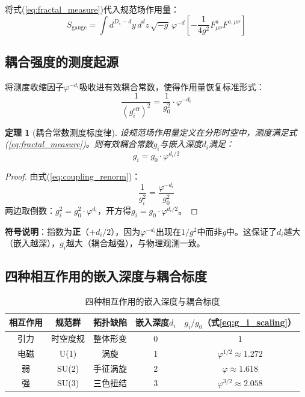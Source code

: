 \documentclass[12pt,a4paper,twocolumn]{article}
\renewcommand{\phi}{\varphi}
\newtheorem{theorem}{定理}[section]
\begin{document}
将式(\ref{eq:fractal_measure})代入规范场作用量：
\[
S_{\text{gauge}} = \int d^{D_s-d}y \, d^d z \, \sqrt{-g} \, \phi^{-d} \left[ -\frac{1}{4g^2} F_{\mu\nu}^a F^{a,\mu\nu} \right]
\]

\subsection{耦合强度的测度起源}
将测度收缩因子$\phi^{-d_i}$吸收进有效耦合常数，使得作用量恢复标准形式：
\begin{equation}
\frac{1}{(g_i^{\text{eff}})^2} = \frac{1}{g_0^2} \cdot \phi^{-d_i}
\label{eq:coupling_renorm}
\end{equation}

\begin{theorem}[耦合常数测度标度律]
设规范场作用量定义在分形时空中，测度满足式(\ref{eq:fractal_measure})。则有效耦合常数$g_i$与嵌入深度$d_i$满足：
\begin{equation}
g_i = g_0 \cdot \phi^{d_i/2}
\label{eq:g_i_scaling}
\end{equation}
\end{theorem}

\begin{proof}
由式(\ref{eq:coupling_renorm})：
\[
\frac{1}{g_i^2} = \frac{\phi^{-d_i}}{g_0^2}
\]
两边取倒数：$g_i^2 = g_0^2 \cdot \phi^{d_i}$，开方得$g_i = g_0 \cdot \phi^{d_i/2}$。
\end{proof}

\noindent\textbf{符号说明}：指数为\textbf{正}（$+d_i/2$），因为$\phi^{-d_i}$出现在$1/g^2$中而非$g$中。这保证了$d_i$越大（嵌入越深），$g_i$越大（耦合越强），与物理观测一致。

\subsection{四种相互作用的嵌入深度与耦合标度}

\begin{table}[H]
\centering
\footnotesize
\caption{四种相互作用的嵌入深度与耦合标度}
\begin{tabular}{c|c|c|c|c}
\hline
\textbf{相互作用} & \textbf{规范群} & \textbf{拓扑缺陷} & \textbf{嵌入深度}$d_i$ & \textbf{$g_i/g_0$（式\ref{eq:g_i_scaling}）} \\
\hline
引力 & 时空度规 & 整体形变 & 0 & $1$ \\
电磁 & U(1) & 涡旋 & 1 & $\phi^{1/2}\approx1.272$ \\
弱 & SU(2) & 手征涡旋 & 2 & $\phi\approx1.618$ \\
强 & SU(3) & 三色扭结 & 3 & $\phi^{3/2}\approx2.058$ \\
\hline
\end{tabular}
\end{table}
\end{document}
